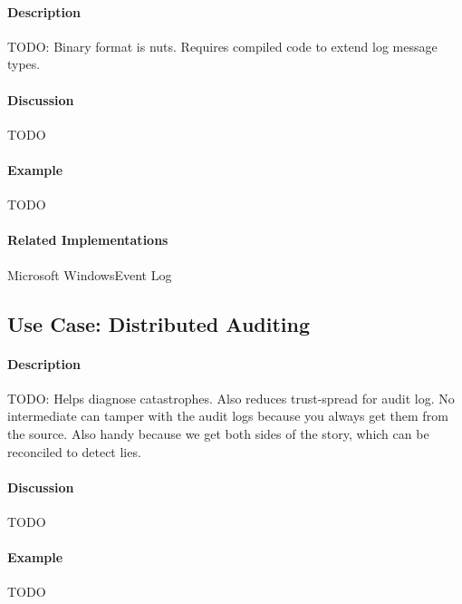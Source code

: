 \paragraph{Description}

{\Large TODO:} Binary format is nuts. Requires compiled code to extend log message types.

\paragraph{Discussion}

{\Large TODO}

\paragraph{Example}

{\Large TODO}

\paragraph{Related Implementations}

Microsoft Windows\texttrademark Event Log

\subsection{Use Case: Distributed Auditing}

\paragraph{Description}

{\Large TODO:} Helps diagnose catastrophes.  Also reduces trust-spread for audit log.  No intermediate can tamper with the audit logs because you always get them from the source.  Also handy because we get both sides of the story, which can be reconciled to detect lies.

\paragraph{Discussion}

{\Large TODO}

\paragraph{Example}

{\Large TODO}

